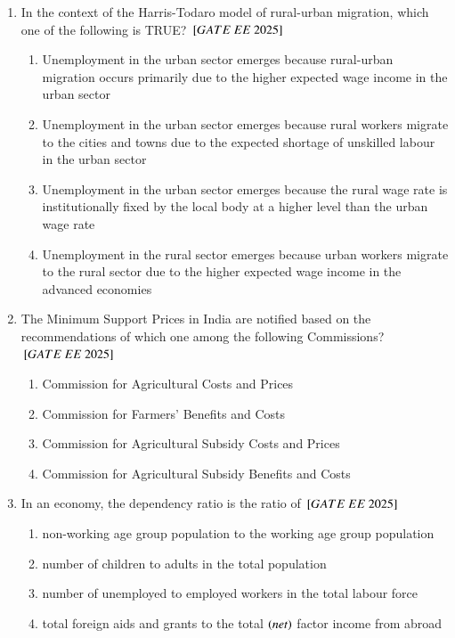 \documentclass[journal,12pt,onecolumn]{IEEEtran}
\theoremstyle{remark}
\begin{document}
\begin{enumerate}
\item In the context of the Harris-Todaro model of rural-urban migration, which one of the following is TRUE?
\hfill ${}\left[GATE\ EE\ 2025\right]$
    \begin{enumerate}
    \item Unemployment in the urban sector emerges because rural-urban migration occurs primarily due to the higher expected wage income in the urban sector
    \item Unemployment in the urban sector emerges because rural workers migrate to the cities and towns due to the expected shortage of unskilled labour in the urban sector
    \item Unemployment in the urban sector emerges because the rural wage rate is institutionally fixed by the local body at a higher level than the urban wage rate
    \item Unemployment in the rural sector emerges because urban workers migrate to the rural sector due to the higher expected wage income in the advanced economies
  \end{enumerate}
 
\item The Minimum Support Prices in India are notified based on the recommendations of which one among the following Commissions?
\hfill ${}\left[GATE\ EE\ 2025\right]$
    \begin{enumerate}
    \item Commission for Agricultural Costs and Prices
    \item Commission for Farmers' Benefits and Costs
    \item Commission for Agricultural Subsidy Costs and Prices
    \item Commission for Agricultural Subsidy Benefits and Costs
 \end{enumerate}
 
\item In an economy, the dependency ratio is the ratio of
\hfill ${}\left[GATE\ EE\ 2025\right]$
    \begin{enumerate}
    \item non-working age group population to the working age group population
    \item number of children to adults in the total population
    \item number of unemployed to employed workers in the total labour force
    \item total foreign aids and grants to the total  $\left(net\right)$ factor income from abroad
  \end{enumerate}
 

\end{enumerate}
\end{document}
